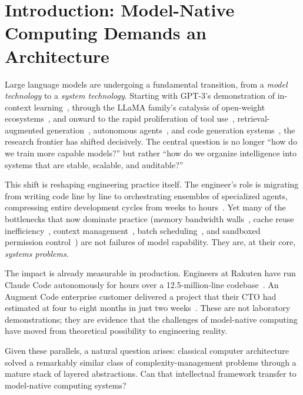 \section{Introduction: Model-Native Computing Demands an Architecture}
\label{sec:intro}

Large language models are undergoing a fundamental transition, from a \emph{model technology} to a \emph{system technology}.
Starting with GPT-3's demonstration of in-context learning~\cite{brown2020gpt3}, through the LLaMA family's catalysis of open-weight ecosystems~\cite{llama2023}, and onward to the rapid proliferation of tool use~\cite{schick2023toolformer}, retrieval-augmented generation~\cite{lewis2020rag}, autonomous agents~\cite{yao2023react}, and code generation systems~\cite{openhands_paper_2025,sweagent2024}, the research frontier has shifted decisively.
The central question is no longer ``how do we train more capable models?'' but rather ``how do we organize intelligence into systems that are stable, scalable, and auditable?''

This shift is reshaping engineering practice itself.
The engineer's role is migrating from writing code line by line to orchestrating ensembles of specialized agents, compressing entire development cycles from weeks to hours~\cite{anthropic2026agenticreport}.
Yet many of the bottlenecks that now dominate practice (memory bandwidth walls~\cite{gholami2024memorywall}, cache reuse inefficiency~\cite{kwon2023pagedattention}, context management~\cite{memgpt2023}, batch scheduling~\cite{orca2022}, and sandboxed permission control~\cite{ironclaw2025}) are not failures of model capability.
They are, at their core, \emph{systems problems}.

The impact is already measurable in production.
Engineers at Rakuten have run Claude Code autonomously for hours over a 12.5-million-line codebase~\cite{anthropic2026agenticreport}.
An Augment Code enterprise customer delivered a project that their CTO had estimated at four to eight months in just two weeks~\cite{anthropic2026agenticreport}.
These are not laboratory demonstrations; they are evidence that the challenges of model-native computing have moved from theoretical possibility to engineering reality.

Given these parallels, a natural question arises: classical computer architecture solved a remarkably similar class of complexity-management problems through a mature stack of layered abstractions.
Can that intellectual framework transfer to model-native computing systems?

